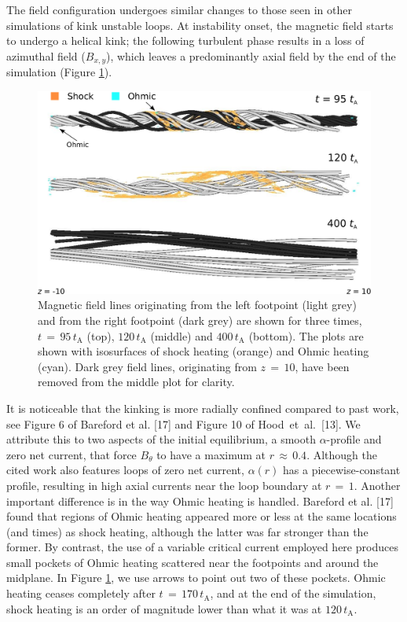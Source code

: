 \documentclass{./packages/rs/rsproca}
\begin{document}
The field configuration undergoes similar changes to those seen in other simulations of kink unstable loops. At instability onset, the magnetic field starts to undergo a helical kink; the following turbulent phase results in a loss of azimuthal field ($B_{x,y}$), which leaves a predominantly axial field by the end of the simulation (Figure \ref{bfield_voheat}).
\begin{figure}[h!]
  \center  
  \includegraphics[scale=0.4]{./inkscape/256x256x512/bfield_voheat}
  \caption{\small{Magnetic field lines originating from the left footpoint (light grey) and from the right footpoint (dark grey) are shown for three times, $t\,{=}\,95\,t_{\mathrm{A}}$ (top), $120\,t_{\mathrm{A}}$ (middle) and $400\,t_{\mathrm{A}}$ (bottom). The plots are shown with isosurfaces of shock heating (orange) and Ohmic heating (cyan). Dark grey field lines, originating from $z\,{=}\,10$, have been removed from the middle plot for clarity.}}
  \label{bfield_voheat}
  \vspace{-10pt}
\end{figure}
It is noticeable that the kinking is more radially confined compared to past work, see Figure 6 of Bareford et al. [17] and Figure 10 of \mbox{Hood et al. [13]}. We attribute this to two aspects of the initial equilibrium, a smooth $\alpha$-profile and zero net current, that force $B_{\theta}$ to have a maximum at $r\,{\approx}\,0.4$. Although the cited work also features loops of zero net current, $\alpha (r)$ has a piecewise-constant profile, resulting in high axial currents near the loop boundary at $r\,{=}\,1$. Another important difference is in the way Ohmic heating is handled. Bareford et al. [17] found that regions of Ohmic heating appeared more or less at the same locations (and times) as shock heating, although the latter was far stronger than the former. By contrast, the use of a variable critical current employed here produces small pockets of Ohmic heating scattered near the footpoints and around the midplane. In Figure \ref{bfield_voheat}, we use arrows to point out two of these pockets. Ohmic heating ceases completely after $t\,{=}\,170\,t_{\mathrm{A}}$, and at the end of the simulation, shock heating is an order of magnitude lower than what it was at $120\,t_{\mathrm{A}}$. 
\end{document}
